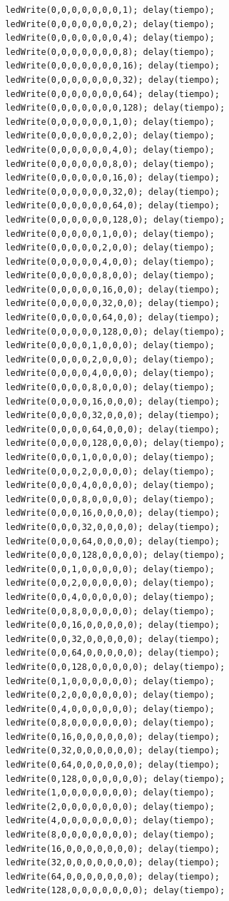 \documentclass{article}
\begin{document}
\begin{verbatim}
  ledWrite(0,0,0,0,0,0,0,1); delay(tiempo);
  ledWrite(0,0,0,0,0,0,0,2); delay(tiempo);
  ledWrite(0,0,0,0,0,0,0,4); delay(tiempo);
  ledWrite(0,0,0,0,0,0,0,8); delay(tiempo);
  ledWrite(0,0,0,0,0,0,0,16); delay(tiempo);
  ledWrite(0,0,0,0,0,0,0,32); delay(tiempo);
  ledWrite(0,0,0,0,0,0,0,64); delay(tiempo);
  ledWrite(0,0,0,0,0,0,0,128); delay(tiempo);
  ledWrite(0,0,0,0,0,0,1,0); delay(tiempo);
  ledWrite(0,0,0,0,0,0,2,0); delay(tiempo);
  ledWrite(0,0,0,0,0,0,4,0); delay(tiempo);
  ledWrite(0,0,0,0,0,0,8,0); delay(tiempo);
  ledWrite(0,0,0,0,0,0,16,0); delay(tiempo);
  ledWrite(0,0,0,0,0,0,32,0); delay(tiempo);
  ledWrite(0,0,0,0,0,0,64,0); delay(tiempo);
  ledWrite(0,0,0,0,0,0,128,0); delay(tiempo);
  ledWrite(0,0,0,0,0,1,0,0); delay(tiempo);
  ledWrite(0,0,0,0,0,2,0,0); delay(tiempo);
  ledWrite(0,0,0,0,0,4,0,0); delay(tiempo);
  ledWrite(0,0,0,0,0,8,0,0); delay(tiempo);
  ledWrite(0,0,0,0,0,16,0,0); delay(tiempo);
  ledWrite(0,0,0,0,0,32,0,0); delay(tiempo);
  ledWrite(0,0,0,0,0,64,0,0); delay(tiempo);
  ledWrite(0,0,0,0,0,128,0,0); delay(tiempo);
  ledWrite(0,0,0,0,1,0,0,0); delay(tiempo);
  ledWrite(0,0,0,0,2,0,0,0); delay(tiempo);
  ledWrite(0,0,0,0,4,0,0,0); delay(tiempo);
  ledWrite(0,0,0,0,8,0,0,0); delay(tiempo);
  ledWrite(0,0,0,0,16,0,0,0); delay(tiempo);
  ledWrite(0,0,0,0,32,0,0,0); delay(tiempo);
  ledWrite(0,0,0,0,64,0,0,0); delay(tiempo);
  ledWrite(0,0,0,0,128,0,0,0); delay(tiempo);
  ledWrite(0,0,0,1,0,0,0,0); delay(tiempo);
  ledWrite(0,0,0,2,0,0,0,0); delay(tiempo);
  ledWrite(0,0,0,4,0,0,0,0); delay(tiempo);
  ledWrite(0,0,0,8,0,0,0,0); delay(tiempo);
  ledWrite(0,0,0,16,0,0,0,0); delay(tiempo);
  ledWrite(0,0,0,32,0,0,0,0); delay(tiempo);
  ledWrite(0,0,0,64,0,0,0,0); delay(tiempo);
  ledWrite(0,0,0,128,0,0,0,0); delay(tiempo);
  ledWrite(0,0,1,0,0,0,0,0); delay(tiempo);
  ledWrite(0,0,2,0,0,0,0,0); delay(tiempo);
  ledWrite(0,0,4,0,0,0,0,0); delay(tiempo);
  ledWrite(0,0,8,0,0,0,0,0); delay(tiempo);
  ledWrite(0,0,16,0,0,0,0,0); delay(tiempo);
  ledWrite(0,0,32,0,0,0,0,0); delay(tiempo);
  ledWrite(0,0,64,0,0,0,0,0); delay(tiempo);
  ledWrite(0,0,128,0,0,0,0,0); delay(tiempo);
  ledWrite(0,1,0,0,0,0,0,0); delay(tiempo);
  ledWrite(0,2,0,0,0,0,0,0); delay(tiempo);
  ledWrite(0,4,0,0,0,0,0,0); delay(tiempo);
  ledWrite(0,8,0,0,0,0,0,0); delay(tiempo);
  ledWrite(0,16,0,0,0,0,0,0); delay(tiempo);
  ledWrite(0,32,0,0,0,0,0,0); delay(tiempo);
  ledWrite(0,64,0,0,0,0,0,0); delay(tiempo);
  ledWrite(0,128,0,0,0,0,0,0); delay(tiempo);
  ledWrite(1,0,0,0,0,0,0,0); delay(tiempo);
  ledWrite(2,0,0,0,0,0,0,0); delay(tiempo);
  ledWrite(4,0,0,0,0,0,0,0); delay(tiempo);
  ledWrite(8,0,0,0,0,0,0,0); delay(tiempo);
  ledWrite(16,0,0,0,0,0,0,0); delay(tiempo);
  ledWrite(32,0,0,0,0,0,0,0); delay(tiempo);
  ledWrite(64,0,0,0,0,0,0,0); delay(tiempo);
  ledWrite(128,0,0,0,0,0,0,0); delay(tiempo);
  

\end{verbatim}
\end{document}
